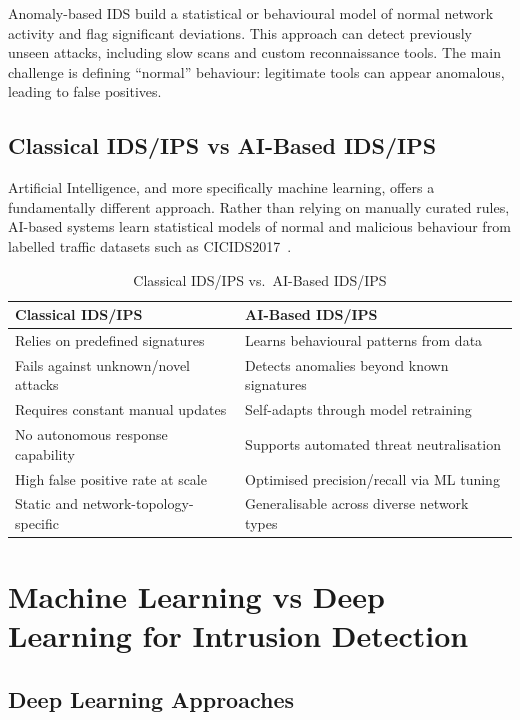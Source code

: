\documentclass[12pt,a4paper]{report}
\begin{document}
Anomaly-based IDS build a statistical or behavioural model of normal network activity and flag significant deviations. This approach can detect previously unseen attacks, including slow scans and custom reconnaissance tools. The main challenge is defining ``normal'' behaviour: legitimate tools can appear anomalous, leading to false positives.

\subsection{Classical IDS/IPS vs AI-Based IDS/IPS}

Artificial Intelligence, and more specifically machine learning, offers a fundamentally different approach. Rather than relying on manually curated rules, AI-based systems learn statistical models of normal and malicious behaviour from labelled traffic datasets such as CICIDS2017~\cite{cicids2017}.

\begin{table}[H]
\centering
\caption{Classical IDS/IPS vs.\ AI-Based IDS/IPS}
\label{tab:ids-comparison}
\begin{tabularx}{\textwidth}{XX}
\toprule
\textbf{Classical IDS/IPS} & \textbf{AI-Based IDS/IPS} \\
\midrule
Relies on predefined signatures & Learns behavioural patterns from data \\
Fails against unknown/novel attacks & Detects anomalies beyond known signatures \\
Requires constant manual updates & Self-adapts through model retraining \\
No autonomous response capability & Supports automated threat neutralisation \\
High false positive rate at scale & Optimised precision/recall via ML tuning \\
Static and network-topology-specific & Generalisable across diverse network types \\
\bottomrule
\end{tabularx}
\end{table}

\section{Machine Learning vs Deep Learning for Intrusion Detection}

\subsection{Deep Learning Approaches}
\end{document}
